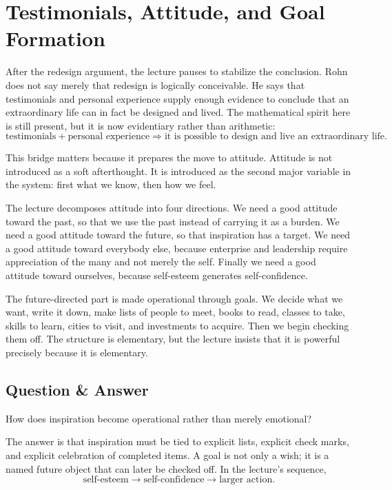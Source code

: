 \section{Testimonials, Attitude, and Goal Formation}

After the redesign argument, the lecture pauses to stabilize the conclusion. Rohn does not say merely that redesign is logically conceivable. He says that testimonials and personal experience supply enough evidence to conclude that an extraordinary life can in fact be designed and lived. The mathematical spirit here is still present, but it is now evidentiary rather than arithmetic:
\begin{equation}
\text{testimonials}+\text{personal experience}
\Longrightarrow
\text{it is possible to design and live an extraordinary life}.
\end{equation}

This bridge matters because it prepares the move to attitude. Attitude is not introduced as a soft afterthought. It is introduced as the second major variable in the system: first what we know, then how we feel.

The lecture decomposes attitude into four directions. We need a good attitude toward the past, so that we use the past instead of carrying it as a burden. We need a good attitude toward the future, so that inspiration has a target. We need a good attitude toward everybody else, because enterprise and leadership require appreciation of the many and not merely the self. Finally we need a good attitude toward ourselves, because self-esteem generates self-confidence.

The future-directed part is made operational through goals. We decide what we want, write it down, make lists of people to meet, books to read, classes to take, skills to learn, cities to visit, and investments to acquire. Then we begin checking them off. The structure is elementary, but the lecture insists that it is powerful precisely because it is elementary.

\subsection{Question \& Answer}

How does inspiration become operational rather than merely emotional?

The answer is that inspiration must be tied to explicit lists, explicit check marks, and explicit celebration of completed items. A goal is not only a wish; it is a named future object that can later be checked off. In the lecture's sequence,
\begin{equation}
\text{self-esteem} \to \text{self-confidence} \to \text{larger action}.
\end{equation}

